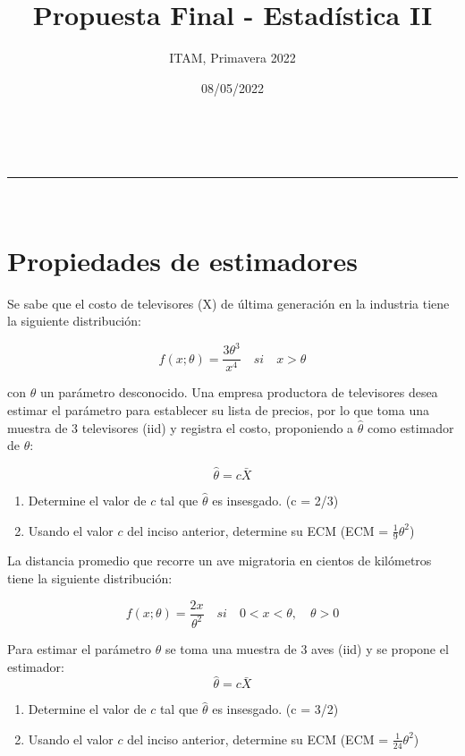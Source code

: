 \documentclass[addpoints]{exam}
\makeatletter
\newcommand{\linia}{\rule{\linewidth}{0.5pt}}
\theoremstyle{mytheor}
\renewcommand{\maketitle}{
    \begin{center}
    \vspace{2ex}
    {\huge \textsc{\@title}}
    \vspace{1ex}
    \\
    \linia\\
    \@author \hfill \@date
    \vspace{4ex}
    \end{center}
  }
\makeatother
\begin{document}
  
  \title{Propuesta Final - Estadística II}
  
  \author{ITAM, Primavera 2022}
  
  \date{08/05/2022}
  
  \maketitle
  
  \section*{Propiedades de estimadores}

  \begin{questions}
  
  \question Se sabe que el costo de televisores (X) de última generación en la industria tiene la siguiente distribución:
  
  $$ f(x; \theta) =  \frac {3 \theta^3}{x^4} \quad si \quad  x > \theta $$
  
  con $\theta$ un parámetro desconocido. Una empresa productora de televisores desea estimar el parámetro para establecer su lista de precios, por lo que toma una muestra de 3 televisores (iid) y registra el costo, proponiendo a $\hat{\theta}$ como estimador de $\theta$:
  
  $$ \hat{\theta}  = c \bar{X} $$
  
  \begin{enumerate}
  \item Determine el valor de $c$ tal que $\hat{\theta}$ es insesgado. (c = 2/3)
  \item Usando el valor $c$ del inciso anterior, determine su ECM (ECM = $\frac{1}{9} \theta^2$)
  \end{enumerate}
  
  
  \question La distancia promedio que recorre un ave migratoria en cientos de kilómetros tiene la siguiente distribución:
  
  $$ f(x; \theta) =  \frac {2x}{\theta^2} \quad si \quad  0 < x < \theta, \quad \theta > 0$$
  
  Para estimar el parámetro $\theta$ se toma una muestra de 3 aves (iid) y se propone el estimador: 
  $$ \hat{\theta}  = c \bar{X} $$
  
  \begin{enumerate}
  \item Determine el valor de $c$ tal que $\hat{\theta}$ es insesgado. (c = 3/2)
  \item Usando el valor $c$ del inciso anterior, determine su ECM (ECM = $\frac{1}{24} \theta^2$)
  \end{enumerate}
  
  \end{questions}
  
\end{document}

